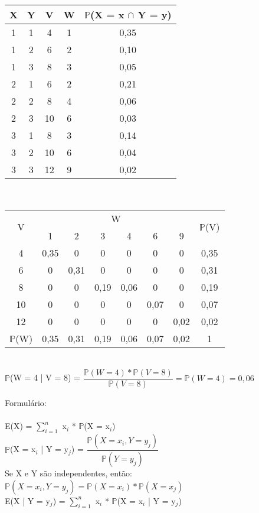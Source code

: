 \documentclass[12pt,a4paper]{article}
\begin{document}
	\begin{center}
		\begin{tabular}{ccccc}
			X & Y & V & W & $\mathbb{P}$(X = x $\cap$ Y = y)\\ \midrule
			1 & 1 & 4 & 1 & 0,35 \\ \midrule
			1 & 2 & 6 & 2 & 0,10 \\ \midrule
			1 & 3 & 8 & 3 & 0,05 \\ \midrule
			2 & 1 & 6 & 2 & 0,21 \\ \midrule
			2 & 2 & 8 & 4 & 0,06\\ \midrule
			2 & 3 & 10 & 6 & 0,03\\ \midrule
			3 & 1 & 8 & 3 & 0,14\\ \midrule
			3 & 2 & 10 & 6 & 0,04\\ \midrule
			3 & 3 & 12 & 9 & 0,02\\ \midrule		
		\end{tabular}
		\vspace{1cm}\\
		\begin{tabular}{|c|c|c|c|c|c|c|c|}\hline
			\multirow{2}{*}{V} & \multicolumn{6}{c|}{W} & \multirow{2}{*}{$\mathbb{P}$(V)}\\ \cline{2-7}
			& 1 & 2 & 3 & 4 & 6 & 9 & \\ \hline
			4 & 0,35 & 0 & 0 & 0 & 0 & 0 & 0,35\\ \hline
			6 & 0 & 0,31 & 0 & 0 & 0 & 0 & 0,31\\ \hline
			8 & 0 & 0 & 0,19 & 0,06 & 0 & 0 & 0,19\\ \hline
			10 & 0 & 0 & 0 & 0 & 0,07 & 0 & 0,07\\ \hline
			12 & 0 & 0 & 0 & 0 & 0 & 0,02 & 0,02\\ \hline
			$\mathbb{P}$(W) & 0,35 & 0,31 & 0,19 & 0,06 & 0,07 & 0,02 & 1\\ \hline
		\end{tabular}
		\vspace{1cm}\\
		$\mathbb{P}$(W = 4 | V = 8) = $\dfrac{\mathbb{P}(W = 4) * \mathbb{P}(V = 8)}{\mathbb{P}(V = 8)} = \mathbb{P}(W = 4) = 0,06$  
	\end{center}
	\vspace{2cm}
	Formulário:\\
	\vspace{0.25cm}\\
	E(X) = $\sum_{i=1}^{n}$ x$_{i}$ * $\mathbb{P}$(X = x$_{i}$) 
	\vspace{0.25cm}\\
	$\mathbb{P}$(X = x$_{i}$ | Y = y$_{j}$) = $\dfrac{\mathbb{P}(X = x_{i}, Y = y_{j})}{\mathbb{P}(Y = y_{j})}$
	\vspace{0.25cm}\\
	Se X e Y são independentes, então: $\mathbb{P}(X = x_{i}, Y = y_{j}) = \mathbb{P}(X = x_{i}) * \mathbb{P}(X = x_{j})$
	\vspace{0.25cm}\\
	E(X | Y = y$_{j}$) = $\sum_{i=1}^{n}$ x$_{i}$ * $\mathbb{P}$(X = x$_{i}$ | Y = y$_{j}$)
\end{document}
